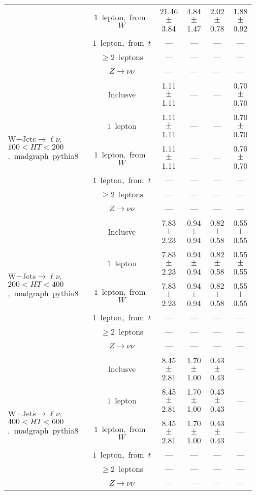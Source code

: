 \documentclass{article}
\begin{document}
\begin{longtable}{|l|c|c|c|c|c|}
 & $1$~lepton,~from~$W$  & 21.46 $\pm$ 3.84  & 4.84 $\pm$ 1.47  & 2.02 $\pm$ 0.78  & 1.88 $\pm$ 0.92 \\* 
 & $1$~lepton,~from~$t$  & ---  & ---  & ---  & --- \\* 
 & $\ge2$~leptons  & ---  & ---  & ---  & --- \\* 
 & $Z\rightarrow\nu\nu$  & ---  & ---  & ---  & --- \\* 
\hline 
\multirow{6}{*}{W+Jets$\rightarrow\ell\nu$,~$100<HT<200$,~madgraph~pythia8} & Inclusve  & 1.11 $\pm$ 1.11  & ---  & ---  & 0.70 $\pm$ 0.70 \\* 
 & $1$~lepton  & 1.11 $\pm$ 1.11  & ---  & ---  & 0.70 $\pm$ 0.70 \\* 
 & $1$~lepton,~from~$W$  & 1.11 $\pm$ 1.11  & ---  & ---  & 0.70 $\pm$ 0.70 \\* 
 & $1$~lepton,~from~$t$  & ---  & ---  & ---  & --- \\* 
 & $\ge2$~leptons  & ---  & ---  & ---  & --- \\* 
 & $Z\rightarrow\nu\nu$  & ---  & ---  & ---  & --- \\* 
\hline 
\multirow{6}{*}{W+Jets$\rightarrow\ell\nu$,~$200<HT<400$,~madgraph~pythia8} & Inclusve  & 7.83 $\pm$ 2.23  & 0.94 $\pm$ 0.94  & 0.82 $\pm$ 0.58  & 0.55 $\pm$ 0.55 \\* 
 & $1$~lepton  & 7.83 $\pm$ 2.23  & 0.94 $\pm$ 0.94  & 0.82 $\pm$ 0.58  & 0.55 $\pm$ 0.55 \\* 
 & $1$~lepton,~from~$W$  & 7.83 $\pm$ 2.23  & 0.94 $\pm$ 0.94  & 0.82 $\pm$ 0.58  & 0.55 $\pm$ 0.55 \\* 
 & $1$~lepton,~from~$t$  & ---  & ---  & ---  & --- \\* 
 & $\ge2$~leptons  & ---  & ---  & ---  & --- \\* 
 & $Z\rightarrow\nu\nu$  & ---  & ---  & ---  & --- \\* 
\hline 
\multirow{6}{*}{W+Jets$\rightarrow\ell\nu$,~$400<HT<600$,~madgraph~pythia8} & Inclusve  & 8.45 $\pm$ 2.81  & 1.70 $\pm$ 1.00  & 0.43 $\pm$ 0.43  & --- \\* 
 & $1$~lepton  & 8.45 $\pm$ 2.81  & 1.70 $\pm$ 1.00  & 0.43 $\pm$ 0.43  & --- \\* 
 & $1$~lepton,~from~$W$  & 8.45 $\pm$ 2.81  & 1.70 $\pm$ 1.00  & 0.43 $\pm$ 0.43  & --- \\* 
 & $1$~lepton,~from~$t$  & ---  & ---  & ---  & --- \\* 
 & $\ge2$~leptons  & ---  & ---  & ---  & --- \\* 
 & $Z\rightarrow\nu\nu$  & ---  & ---  & ---  & --- \\* 

\end{longtable}
\end{document}
